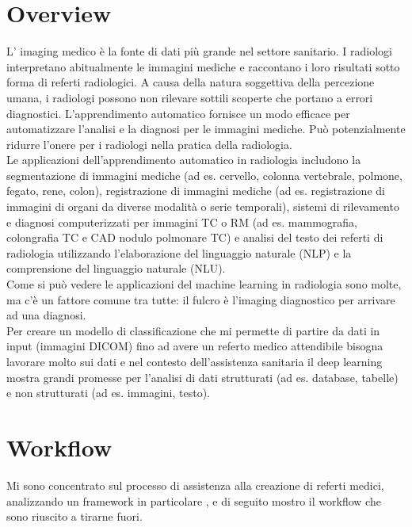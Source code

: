 \documentclass[12pt,a4paper]{report}
\begin{document}
\section{Overview}
L’ imaging medico è la fonte di dati più grande nel settore sanitario. 
I radiologi interpretano abitualmente le immagini mediche e raccontano i loro risultati sotto forma di referti radiologici. A causa della natura soggettiva della percezione umana, i radiologi possono non rilevare sottili scoperte che portano a errori diagnostici.
L'apprendimento automatico fornisce un modo efficace per automatizzare l'analisi e la diagnosi per le immagini mediche. Può potenzialmente ridurre l'onere per i radiologi nella pratica della radiologia.\\
Le applicazioni dell'apprendimento automatico in radiologia includono la segmentazione di immagini mediche (ad es. cervello, colonna vertebrale, polmone, fegato, rene, colon), registrazione di immagini mediche (ad es. registrazione di immagini di organi da diverse modalità o serie temporali), sistemi di rilevamento e diagnosi computerizzati per immagini TC o RM (ad es. mammografia, colongrafia TC e CAD nodulo polmonare TC) e analisi del testo dei referti di radiologia utilizzando l'elaborazione del linguaggio naturale (NLP) e la comprensione del linguaggio naturale (NLU).\\
Come si può vedere le applicazioni del machine learning in radiologia sono molte, ma c’è un fattore comune tra tutte: il fulcro è l’imaging diagnostico per arrivare ad una diagnosi.\\
Per creare un modello di classificazione che mi permette di partire da dati in input (immagini DICOM) fino ad avere un referto medico attendibile bisogna lavorare molto sui dati e nel contesto dell'assistenza sanitaria il deep learning mostra grandi promesse per l'analisi di dati strutturati (ad es. database, tabelle) e non strutturati (ad es. immagini, testo).


\section{Workflow}
Mi sono concentrato sul processo di assistenza alla creazione di referti medici, analizzando un framework in particolare \cite{singh2019chest}, e di seguito mostro il workflow che sono riuscito a tirarne fuori.
\end{document}
